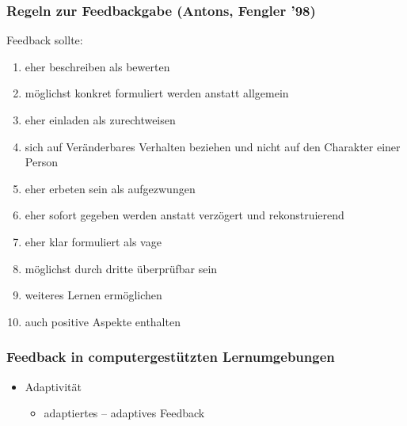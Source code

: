 \begin{frame}[<+->]
	\frametitle{Regeln zur Feedbackgabe  \small(Antons, Fengler '98)}
	Feedback sollte:
	\begin{enumerate}
		\item eher beschreiben als bewerten
		\item möglichst konkret formuliert werden anstatt allgemein
		\item eher einladen als zurechtweisen
		\item sich auf Veränderbares Verhalten beziehen und nicht auf den Charakter einer Person
		\item eher erbeten sein als aufgezwungen
		\item eher sofort gegeben werden anstatt verzögert und rekonstruierend
		\item eher klar formuliert als vage
		\item möglichst durch dritte überprüfbar sein
		\item weiteres Lernen ermöglichen
		\item auch positive Aspekte enthalten
	\end{enumerate}
\end{frame}

\begin{frame}
	\frametitle{Feedback in computergestützten Lernumgebungen}
	\begin{itemize}
		\item Adaptivität
		\begin{itemize}
			\item adaptiertes – adaptives Feedback
		\end{itemize}
	\end{itemize}
\end{frame}

